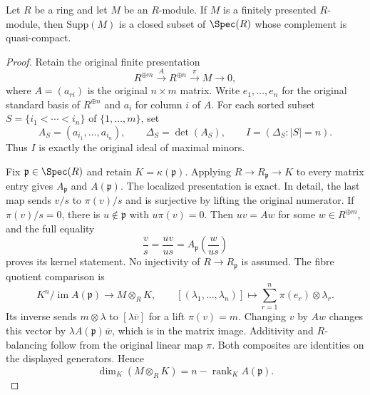\begin{lemma}
\label{editorial-source-lemma-support-finite-presentation-constructible}
Let $R$ be a ring and let $M$ be an $R$-module.
If $M$ is a finitely presented $R$-module, then $\text{Supp}(M)$ is a
closed subset of $\Spec(R)$ whose complement is quasi-compact.
\end{lemma}

\begin{proof}
Retain the original finite presentation
$$
R^{\oplus m}\xrightarrow{A}R^{\oplus n}
\xrightarrow{\pi}M\longrightarrow0,
$$
where $A=(a_{ri})$ is the original $n\times m$ matrix.
Write $e_1,\ldots,e_n$ for the original standard basis
of $R^{\oplus n}$ and $a_i$ for column $i$ of $A$.
For each sorted subset $S=\{i_1<\cdots<i_n\}$ of
$\{1,\ldots,m\}$, set
$$
A_S=(a_{i_1},\ldots,a_{i_n}),\qquad
\Delta_S=\det(A_S),\qquad
I=(\Delta_S:|S|=n).
$$
Thus $I$ is exactly the original ideal of maximal minors.

Fix $\mathfrak p\in\Spec(R)$ and retain
$K=\kappa(\mathfrak p)$.
Applying $R\to R_{\mathfrak p}\to K$ to every matrix
entry gives $A_{\mathfrak p}$ and $A(\mathfrak p)$.
The localized presentation is exact. In detail, the last
map sends $v/s$ to $\pi(v)/s$ and is surjective by lifting
the original numerator. If $\pi(v)/s=0$, there is
$u\notin\mathfrak p$ with $u\pi(v)=0$. Then $uv=Aw$
for some $w\in R^{\oplus m}$, and the full equality
$$
\frac vs=\frac{uv}{us}
=A_{\mathfrak p}\left(\frac w{us}\right)
$$
proves its kernel statement. No injectivity of
$R\to R_{\mathfrak p}$ is assumed.
The fibre quotient comparison is
$$
K^n/\operatorname{im}A(\mathfrak p)
\longrightarrow M\otimes_RK,
\qquad
[(\lambda_1,\ldots,\lambda_n)]
\longmapsto\sum_{r=1}^n\pi(e_r)\otimes\lambda_r.
$$
Its inverse sends $m\otimes\lambda$ to
$[\lambda\overline v]$ for a lift $\pi(v)=m$.
Changing $v$ by $Aw$ changes this vector by
$\lambda A(\mathfrak p)\overline w$, which is in the
matrix image. Additivity and $R$-balancing follow from
the original linear map $\pi$. Both composites are
identities on the displayed generators. Hence
$$
\dim_K(M\otimes_RK)=n-\operatorname{rank}_K A(\mathfrak p).
$$


\end{proof}
